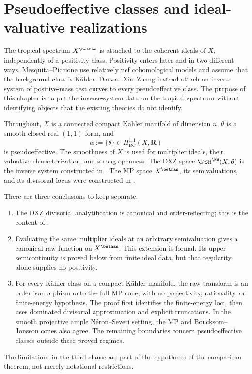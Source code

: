 \chapter{Pseudoeffective classes and ideal-valuative realizations}
\label{chap:pseff-mp-dxz}

The tropical spectrum $X^{\bethan}$ is attached to the coherent ideals
of $X$, independently of a positivity class.  Positivity enters later and
in two different ways.  Mesquita--Piccione use relatively nef
cohomological models and assume that the background class is K\"ahler.
Darvas--Xia--Zhang instead attach an inverse system of positive-mass test
curves to every pseudoeffective class.  The purpose of this chapter is to
put the inverse-system data on the tropical spectrum without identifying
objects that the existing theories do not identify.

Throughout, $X$ is a connected compact K\"ahler manifold of dimension
$n$, $\theta$ is a smooth closed real $(1,1)$-form, and
\[
                    \alpha:=\{\theta\}
       \in H^{1,1}_{\mathrm{BC}}(X,\mathbf R)
\tag{71.1}\label{eq:pseff-background}
\]
is pseudoeffective.  The smoothness of $X$ is used for multiplier ideals,
their valuative characterization, and strong openness.  The DXZ space
$\PSH^{\NA}(X,\theta)$ is the inverse system constructed in
.  The MP space $X^{\bethan}$, its
semivaluations, and its divisorial locus were constructed in
.

There are three conclusions to keep separate.
\begin{enumerate}
\item The DXZ divisorial analytification is canonical and order-reflecting;
      this is the content of \cite[Definition~3.11 and Lemma~4.2]
      {Xia23Operations}.
\item Evaluating the same multiplier ideals at an arbitrary semivaluation
      gives a canonical raw function on $X^{\bethan}$.  This extension is
      formal.  Its upper semicontinuity is proved below from finite ideal
      data, but that regularity alone supplies no positivity.
\item For every K\"ahler class on a compact K\"ahler manifold, the raw
      transform is an order isomorphism onto the full MP cone, with no
      projectivity, rationality, or finite-energy hypothesis. The proof
      first identifies the finite-energy loci, then uses dominated
      divisorial approximation and explicit truncations. In the smooth
      projective ample N\'eron--Severi setting, the MP and
      Boucksom--Jonsson cones also agree. The remaining boundaries concern
      pseudoeffective classes outside these proved regimes.
\end{enumerate}
The limitations in the third clause are part of the hypotheses of the
comparison theorem, not merely notational restrictions.

